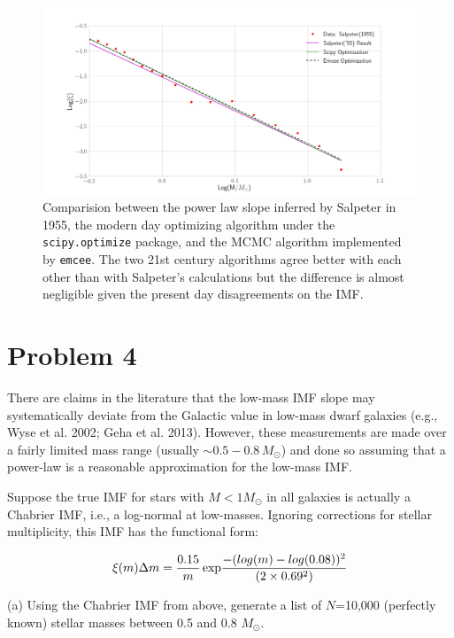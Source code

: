 \documentclass[12pt,usletter,english]{article}
\begin{document}
\begin{figure}[!h]
  \centering \includegraphics[width=13cm]{salpeter_imf.png}
  \caption{Comparision between the power law slope inferred by
    Salpeter in 1955, the modern day optimizing algorithm under the
    \texttt{scipy.optimize} package, and the MCMC algorithm
    implemented by \texttt{emcee}. The two 21st century algorithms
    agree better with each other than with Salpeter's calculations but
    the difference is almost negligible given the present day
    disagreements on the IMF.
    \label{fig:salp}}
\end{figure}

\section{Problem 4}

There are claims in the literature that the low-mass IMF slope may
systematically deviate from the Galactic value in low-mass dwarf
galaxies (e.g., Wyse et al. 2002; Geha et al. 2013).  However, these
measurements are made over a fairly limited mass range (usually $\sim
0.5- 0.8 \, M_{\odot}$) and done so assuming that a power-law is a
reasonable approximation for the low-mass IMF.

Suppose the true IMF for stars with $M<1 M_{\odot}$ in all galaxies is
actually a Chabrier IMF, i.e., a log-normal at low-masses.  Ignoring
corrections for stellar multiplicity, this IMF has the functional
form:

\begin{equation}
\xi(m)\Delta m = \frac{0.15}{m} \, {\rm exp}\frac{-(log(m) -
  log(0.08))^2}{(2\times0.69^2)}
\end{equation}

(a) Using the Chabrier IMF from above, generate a list of $N$=10,000
(perfectly known) stellar masses between 0.5 and 0.8 $M_{\odot}$.  \\
\end{document}
